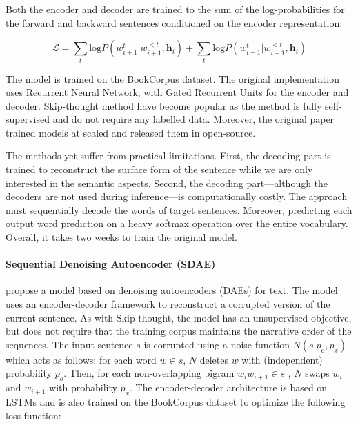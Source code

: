Both the encoder and decoder are trained to  the sum of the log-probabilities for the forward and backward sentences conditioned on the encoder representation:

\begin{equation*}
    \mathcal{L} = \sum_t \text{log} P(w_{i+1}^t | w_{i+1}^{<t}, \textbf{h}_i) + \sum_t \text{log} P(w_{i-1}^t | w_{i-1}^{<t}, \textbf{h}_i)
\end{equation*}

The model is trained on the BookCorpus dataset. The original implementation uses Recurrent Neural Network, with Gated Recurrent Units \parencite{cho_14} for the encoder and decoder. Skip-thought method have become popular as the method is fully self-supervised and do not require any labelled data. Moreover, the original paper trained models at scaled and released them in open-source. 

The methods yet suffer from practical limitations. First, the decoding part is trained to reconstruct the surface form of the sentence while we are only interested in the semantic aspects. Second, the decoding part—although the decoders are not used during inference—is computationally costly. The approach must sequentially decode the words of target sentences. Moreover, predicting each output word prediction on a heavy softmax operation over the entire vocabulary. Overall, it takes two weeks to train the original model. 

\paragraph{Sequential Denoising Autoencoder (SDAE)} \textcite{hill_16} propose a model based on denoising autoencoders (DAEs) for text. The model uses an encoder-decoder framework to reconstruct a corrupted version of the current sentence. As with Skip-thought, the model has an unsupervised objective, but does not require that the training corpus maintains the narrative order of the sequences. The input sentence $s$ is corrupted using a noise function $N(s|p_o, p_x)$ which acts as follows: for each word $w \in s$, $N$ deletes $w$ with (independent) probability $p_o$. Then, for each non-overlapping bigram $w_iw_{i+1} \in s$ , $N$ swaps $w_i$ and $w_{i+1}$ with probability $p_x$. The encoder-decoder architecture is based on LSTMs and is also trained on the BookCorpus dataset to optimize the following loss function:

